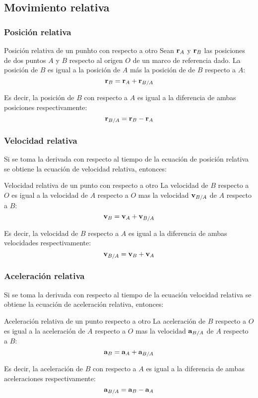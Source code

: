 \subsection*{Movimiento relativa}
\subsubsection*{Posición relativa}
\begin{Theorem*} {Posición relativa de un punhto con respecto a otro}
	Sean $\vb{r}_A$ y $\vb{r}_B$ las posiciones de dos puntos $A$ y $B$ respecto al origen $O$ de un marco de referencia dado. La posición de $B$ es igual a la posición de $A$ más la posición de de $B$ respecto a $A$:
	$$ \vb{r}_B=\vb{r}_A+\vb{r}_{B/A} $$
\end{Theorem*}
Es decir, la posición de $B$ con respecto a $A$ es igual a la diferencia de ambas posiciones respectivamente:
$$ \vb{r}_{B/A}=\vb{r}_B-\vb{r}_A $$
\subsubsection*{Velocidad relativa}
Si se toma la derivada con respecto al tiempo de la ecuación de posición relativa se obtiene la ecuación de velocidad relativa, entonces:
\begin{Theorem*} {Velocidad relativa de un punto con respecto a otro}
	La velocidad de $B$ respecto a $O$ es igual a la velocidad de $A$ respecto a $O$ mas la velocidad $\vb{v}_{B/A}$ de $A$ respecto a $B$:
	$$ \vb{v}_B=\vb{v}_A+\vb{v}_{B/A} $$
\end{Theorem*}
Es decir, la velocidad de $B$ respecto a $A$ es igual a la diferencia de ambas velocidades respectivamente:
$$ \vb{v}_{B/A}=\vb{v}_B+\vb{v}_A $$
\subsubsection*{Aceleración relativa}
Si se toma la derivada con respecto al tiempo de la ecuación velocidad relativa se obtiene la ecuación de aceleración relativa, entonces:
\begin{Theorem*} {Aceleración relativa de un punto respecto a otro}
	La aceleración de $B$ respecto a $O$ es igual a la aceleración de $A$ respecto a $O$ mas la velocidad $\vb{a}_{B/A}$ de $A$ respecto a $B$:
	$$ \vb{a}_B=\vb{a}_A+\vb{a}_{B/A} $$
\end{Theorem*}
Es decir, la aceleración de $B$ con respecto a $A$ es igual a la diferencia de ambas aceleraciones respectivamente:
$$ \vb{a}_{B/A}=\vb{a}_B-\vb{a}_A $$